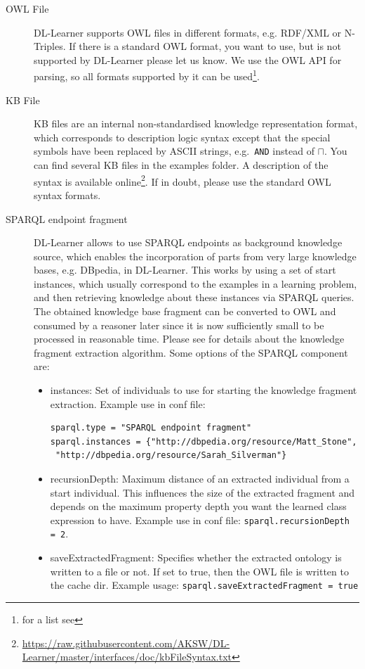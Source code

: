 \documentclass[a4paper,12pt]{scrartcl}
\begin{document}
\begin{description}
 \item[OWL File] DL-Learner supports OWL files in different formats, e.g. RDF/XML or N-Triples. If there is a standard OWL format, you want to use, but is not supported by DL-Learner please let us know. We use the OWL API for parsing, so all formats supported by it can be used\footnote{ for a list see \owlapi}.
 \item[KB File] KB files are an internal non-standardised knowledge representation format, which corresponds to description logic syntax except that the special symbols have been replaced by ASCII strings, e.g.~\verb|AND| instead of $\sqcap$. You can find several KB files in the examples folder. A description of the syntax is available online\footnote{\url{https://raw.githubusercontent.com/AKSW/DL-Learner/master/interfaces/doc/kbFileSyntax.txt}}. If in doubt, please use the standard OWL syntax formats.
 \item[SPARQL endpoint fragment] DL-Learner allows to use SPARQL endpoints as background knowledge source, which enables the incorporation of parts from very large knowledge bases, e.g. DBpedia\cite{2008_dbpedia}, in DL-Learner. This works by using a set of start instances, which usually correspond to the examples in a learning problem, and then retrieving knowledge about these instances via SPARQL queries. The obtained knowledge base fragment can be converted to OWL and consumed by a reasoner later since it is now sufficiently small to be processed in reasonable time. Please see \cite{2009_ijswis} for details about the knowledge fragment extraction algorithm. Some options of the SPARQL component are:
\begin{itemize}
 \item instances: Set of individuals to use for starting the knowledge fragment extraction. Example use in conf file: \begin{verbatim}sparql.type = "SPARQL endpoint fragment"
sparql.instances = {"http://dbpedia.org/resource/Matt_Stone",
 "http://dbpedia.org/resource/Sarah_Silverman"}\end{verbatim}
 \item recursionDepth: Maximum distance of an extracted individual from a start individual. This influences the size of the extracted fragment and depends on the maximum property depth you want the learned class expression to have. Example use in conf file: \verb|sparql.recursionDepth = 2|.
\item saveExtractedFragment: Specifies whether the extracted ontology is written to a file or not. If set to true, then the OWL file is written to the cache dir. Example usage: \verb|sparql.saveExtractedFragment = true|

\end{itemize}
\end{description}
\end{document}
